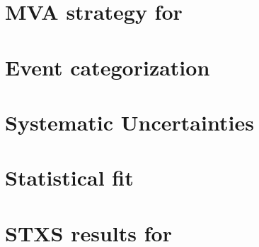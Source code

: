 \section{MVA strategy for \ttHtt}
\label{sec:tth_mva}

\section{Event categorization}
\label{sec:tth_categories}

\section{Systematic Uncertainties}
\label{sec:tth_systematics}

\section{Statistical fit}
\label{sec:statistical_tth}

\section{STXS results for \ttH}
\label{sec:results_ttH}